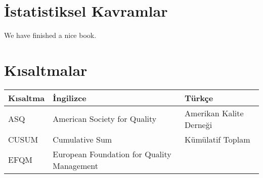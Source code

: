 \documentclass[
]{book}
\begin{document}
\hypertarget{istatistiksel-kavramlar}{%
\chapter{İstatistiksel Kavramlar}\label{istatistiksel-kavramlar}}

We have finished a nice book.

\hypertarget{kux131saltmalar}{%
\chapter{Kısaltmalar}\label{kux131saltmalar}}

\begin{longtable}[]{@{}lll@{}}
\toprule
\begin{minipage}[b]{0.31\columnwidth}\raggedright
Kısaltma\strut
\end{minipage} & \begin{minipage}[b]{0.29\columnwidth}\raggedright
İngilizce\strut
\end{minipage} & \begin{minipage}[b]{0.31\columnwidth}\raggedright
Türkçe\strut
\end{minipage}\tabularnewline
\midrule
\endhead
\begin{minipage}[t]{0.31\columnwidth}\raggedright
ASQ\strut
\end{minipage} & \begin{minipage}[t]{0.29\columnwidth}\raggedright
American Society for Quality\strut
\end{minipage} & \begin{minipage}[t]{0.31\columnwidth}\raggedright
Amerikan Kalite Derneği\strut
\end{minipage}\tabularnewline
\begin{minipage}[t]{0.31\columnwidth}\raggedright
CUSUM\strut
\end{minipage} & \begin{minipage}[t]{0.29\columnwidth}\raggedright
Cumulative Sum\strut
\end{minipage} & \begin{minipage}[t]{0.31\columnwidth}\raggedright
Kümülatif Toplam\strut
\end{minipage}\tabularnewline
\begin{minipage}[t]{0.31\columnwidth}\raggedright
EFQM\strut
\end{minipage} & \begin{minipage}[t]{0.29\columnwidth}\raggedright
European Foundation for Quality Management\strut
\end{minipage} & \begin{minipage}[t]{0.31\columnwidth}\raggedright

\end{minipage}
\end{longtable}
\end{document}
